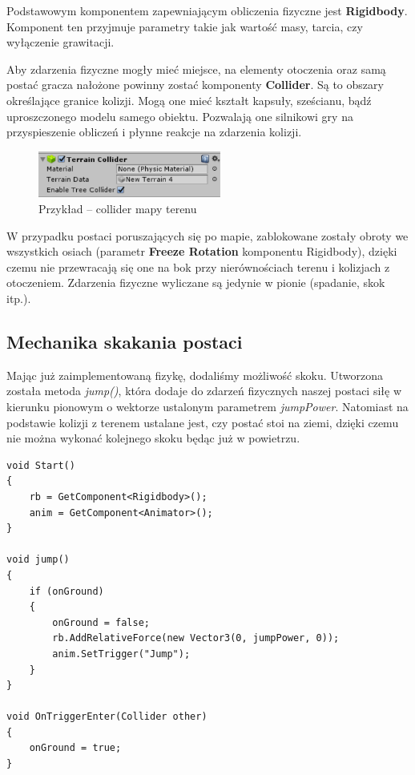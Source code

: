 \documentclass[openright]{xmgr}
\newcommand{\name}[1]{\textbf{\textcolor{NavyBlue}{#1}}}
\begin{document}
      Podstawowym komponentem zapewniającym obliczenia fizyczne jest \name{Rigidbody}. Komponent ten przyjmuje parametry takie jak wartość masy, tarcia, czy wyłączenie grawitacji.

      Aby zdarzenia fizyczne mogły mieć miejsce, na elementy otoczenia oraz samą postać gracza nałożone powinny zostać komponenty \name{Collider}. Są to obszary określające granice kolizji. Mogą one mieć kształt kapsuły, sześcianu, bądź uproszczonego modelu samego obiektu. Pozwalają one silnikowi gry na przyspieszenie obliczeń i płynne reakcje na zdarzenia kolizji.

      \begin{figure}[H]
      \center
      \includegraphics[width=6cm]{fizyka_1.png}
      \caption{Przykład -- collider mapy terenu}
      \end{figure}

      W przypadku postaci poruszających się po mapie, zablokowane zostały obroty we wszystkich osiach (parametr \name{Freeze Rotation} komponentu Rigidbody), dzięki czemu nie przewracają się one na bok przy nierównościach terenu i kolizjach z otoczeniem. Zdarzenia fizyczne wyliczane są jedynie w pionie (spadanie, skok itp.).

      \subsection{Mechanika skakania postaci}

          Mając już zaimplementowaną fizykę, dodaliśmy możliwość skoku. Utworzona została metoda \textit{jump()}, która dodaje do zdarzeń fizycznych naszej postaci siłę w kierunku pionowym o wektorze ustalonym parametrem \textit{jumpPower}. Natomiast na podstawie kolizji z terenem ustalane jest, czy postać stoi na ziemi, dzięki czemu nie można wykonać kolejnego skoku będąc już w powietrzu.

\begin{minipage}{\textwidth}
\begin{lstlisting}[caption={Fragment algorytmu skoku postaci}]
void Start()
{
    rb = GetComponent<Rigidbody>();
    anim = GetComponent<Animator>();
}

void jump()
{
    if (onGround)
    {
        onGround = false;
        rb.AddRelativeForce(new Vector3(0, jumpPower, 0));
        anim.SetTrigger("Jump");
    }
}

void OnTriggerEnter(Collider other)
{
    onGround = true;
}
\end{lstlisting}
\end{minipage}
\end{document}
